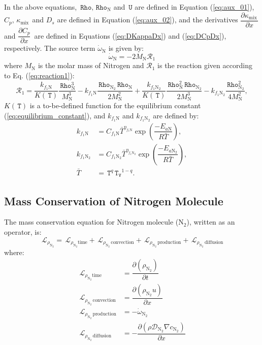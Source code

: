 \documentclass[10pt]{article}
\newcommand{\Diff}[2] {\dfrac{\partial( #1)}{\partial #2}}
\newcommand{\diff}[2] {\dfrac{\partial #1 }{\partial #2}}
\newcommand{\Lo}{\,\mathcal{L}}
\newcommand{\Rho}{\,\mathtt{Rho}}
\newcommand{\T}{\,\mathtt{T}}
\newcommand{\U}{\,\mathtt{U}}
\newcommand{\TV}{\,\mathtt{T_V}}
\newcommand{\N}{\text{N}}
\newcommand{\mix}{\text{mix}\,}
\newcommand{\DKappaDx}{\diff{\kappa_{\mix}}{x}\,}
\newcommand{\DCpDx}{\diff{C_p}{x}\,}
\newcommand{\convection}{\,\text{convection}}
\newcommand{\production}{\,\text{production}}
\newcommand{\diffusion}{\,\text{diffusion}}
\begin{document}
\vspace{10pt}
In the above equations, $\Rho,\Rho_\N$ and $\U$ are defined in Equation (\ref{eq:aux_01}), $C_p,\, \kappa_{\mix}$ and $D_s$ are 
defined in Equation (\ref{eq:aux_02}), and the derivatives $\DKappaDx$ and  $\DCpDx$ are defined in Equations (\ref{eq:DKappaDx})
and (\ref{eq:DCpDx}), respectively.  The source term $\dot{\omega}_\N$ is given by:
$$
\dot{\omega}_\N = -2 M_\N \mathcal{R}_1	
$$
where $M_{\text{N}}$ is the molar mass of Nitrogen and $\mathcal{R}_1$ is the reaction given according to Eq.
(\ref{eq:reaction1}):
\begin{equation}\label{eq:reaction3}
\mathcal{R}_1= \dfrac{k_{f_1 \N}}{K(\T)} \dfrac{\Rho_{\N}^3}{M_\N^3} - k_{f_1 \N}   \dfrac{\Rho_{\N_2} \Rho_{\N}}{2  M_\N^2}+
\dfrac{k_{f_1 \N_2}}{K(\T)} \dfrac{\Rho_\N^2 \Rho_{\N_2}}{2M_\N^3 }- k_{f_1 \N_2} \dfrac{\Rho_{\N_2}^2}{4 M_\N^2},
\end{equation}
$K(\T)$ is a to-be-defined function for the equilibrium constant (\ref{eq:equilibrium_constant}), and $k_{f_1 \text{N}}$ and
$k_{f_1 \text{N}_2}$ are defined by:
\begin{equation}
 \begin{split}\label{eq:forward_rates}
k_{f_1 \text{N}} &= C_{f_1 \text{N}} \bar{T}^{\eta_{f_1 \text{N}}} \exp\left(\dfrac{-E_{a\text{N}}}{R \bar{T}}\right),\\
k_{f_1 \text{N}_2} &= C_{f_1 \text{N}_2} \bar{T}^{\eta_{f_1 \text{N}_2}} \exp\left(\dfrac{-E_{a\text{N}_2}}{R \bar{T}}\right),\\
\bar{T}&=\T^q \TV^{1-q}.
 \end{split}
\end{equation}



\subsection{Mass Conservation of Nitrogen Molecule}

The mass conservation equation for Nitrogen molecule ($\text{N}_2$), written as an operator, is:
\begin{equation*}
 \label{eq:ns1d_11a}
\Lo_{\rho_{\N_2} } = \Lo_{\rho_{\N_2} \text{time}}+\Lo_{\rho_{\N_2} \convection}+\Lo_{\rho_{\N_2} \production}+\Lo_{\rho_{\N_2}
\diffusion} 	
\end{equation*}
where:
\begin{equation}
\begin{split}\label{eq:rhoN2_operators}
 \Lo_{\rho_{\N_2} \text{time}}&= \Diff{\rho_{\N_2}}{t}\\
\Lo_{\rho_{\N_2} \convection}&= \Diff{\rho_{\N_2} u}{x} \\
\Lo_{\rho_{\N_2} \production}&= - \dot{\omega}_{\text{N}_2}\\
\Lo_{\rho_{\N_2} \diffusion}&=  -\diff{ \left(\rho \mathcal{D}_{\N_2} \nabla c_{\N_2} \right)}{x} 
\end{split}
\end{equation}
\end{document}
